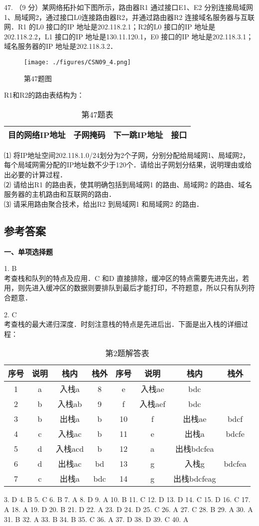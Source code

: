 47. （9 分）某网络拓扑如下图所示，路由器R1 通过接口E1、E2 分别连接局域网1、局域网2，通过接口L0连接路由器R2，并通过路由器R2 连接域名服务器与互联网．R1 的L0 接口的IP 地址是202.118.2.1；R2的L0 接口的IP 地址是202.118.2.2，L1 接口的IP 地址是130.11.120.1，E0 接口的IP 地址是202.118.3.1；域名服务器的IP 地址是202.118.3.2．
\begin{figure}[ht]
\centering
\texttt{[image: ./figures/CSN09\_4.png]}
\caption{第47题图} \label{CSN09_fig4}
\end{figure}
R1和R2的路由表结构为： \\
\begin{table}[ht]
\centering
\caption{第47题表}\label{CSN09_tab4}
\begin{tabular}{|c|c|c|c|}
\hline
目的网络IP地址 & 子网掩码 & 下一跳IP地址 & 接口 \\
\hline
\end{tabular}
\end{table}
⑴ 将IP地址空间202.118.1.0/24划分为2个子网，分别分配给局域网1、局域网2，每个局域网需分配的IP地址数不少于120个．请给出子网划分结果，说明理由或给出必要的计算过程． \\
⑵ 请给出R1 的路由表，使其明确包括到局域网1 的路由、局域网2 的路由、域名服务器的主机路由和互联网的路由． \\
⑶ 请采用路由聚合技术，给出R2 到局域网1 和局域网2 的路由．

\subsection{参考答案}
\textbf{一、单项选择题}

1. B \\
考查栈和队列的特点及应用．C 和D 直接排除，缓冲区的特点需要先进先出，若用，则先进入缓冲区的数据则要排队到最后才能打印，不符题意，所以只有队列符合题意．

2. C \\
考查栈的最大递归深度．时刻注意栈的特点是先进后出．下面是出入栈的详细过程：
\begin{table}[ht]
\centering
\caption{第2题解答表}\label{CSN09_tab5}
\begin{tabular}{|c|c|c|c|c|c|c|c|}
\hline
序号 & 说明 & 栈内 & 栈外 & 序号 & 说明 & 栈内 & 栈外 \\
\hline
1&a&入栈a&8&e&入栈ae&bdc& \\
\hline
2&b&入栈ab&9&f&入栈aef&bdc& \\
\hline
3&b&出栈a&b&10&f&出栈ae&bdcf \\
\hline
4&c&入栈ac&b&11&e&出栈a&bdcfe \\
\hline
5&d&入栈acd&b&12&a&出栈bdcfea& \\
\hline
6&d&出栈ac&bd&13&g&入栈g&bdcfea \\
\hline
7&c&出栈a&bdc&14&g&出栈bdcfeag& \\
\hline
\end{tabular}
\end{table}

3. D 4. B 5. C 6. B 7. A 8. D
9. A 10. B 11. C 12. D 13. D 14. C 15. D 16. C
17. A 18. A 19. D 20. B 21. D 22. A 23. D 24. D
25. C 26. A 27. C 28. B 29. A 30. A 31. B 32. A
33. B 34. B 35. C 36. A 37. D 38. D 39. C 40. A